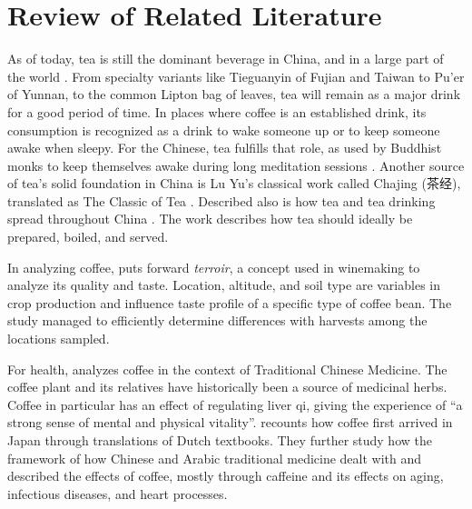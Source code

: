 \chapter{Review of Related Literature}\label{sec:rrl}

As of today, tea is still the dominant beverage in China, and in a large part of
the world \autocite{that_euromon_stat_on_tea}. From specialty variants like
Tieguanyin of Fujian and Taiwan to Pu'er of Yunnan, to the common Lipton bag of
leaves, tea will remain as a major drink for a good period of time.  In places
where coffee is an established drink, its consumption is recognized as a drink
to wake someone up or to keep someone awake when sleepy. For the Chinese, tea
fulfills that role, as used by Buddhist monks to keep themselves awake during
long meditation sessions \autocite[268]{kieschnick_impact_2003}.  Another source
of tea's solid foundation in China is Lu Yu's classical work called Chajing
(茶经), translated as The Classic of Tea \autocite{lu_classic_1974}.  Described
also is how tea and tea drinking spread throughout China
\autocite[266-267]{kieschnick_impact_2003}. The work describes how tea should
ideally be prepared, boiled, and served.

In analyzing coffee, \textcite{silva_characterization_2014} puts forward
\emph{terroir}, a concept used in winemaking to analyze its quality and taste.
Location, altitude, and soil type are variables in crop production and influence
taste profile of a specific type of coffee bean. The study managed to
efficiently determine differences with harvests among the locations sampled.

For health, \textcite{dharmananda_coffee_2003} analyzes coffee in the context of
Traditional Chinese Medicine. The coffee plant and its relatives have
historically been a source of medicinal herbs. Coffee in particular has an
effect of regulating liver qi, giving the experience of ``a strong sense of
mental and physical vitality''. \textcite{namba_historical_2001} recounts how
coffee first arrived in Japan through translations of Dutch textbooks. They
further study how the framework of how Chinese and Arabic traditional medicine
dealt with and described the effects of coffee, mostly through caffeine and its
effects on aging, infectious diseases, and heart processes.

